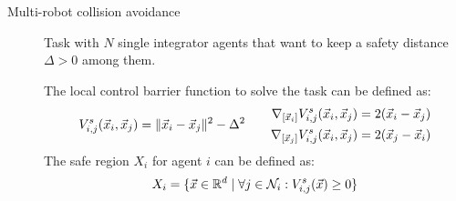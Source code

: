 \begin{description}
    \item[Multi-robot collision avoidance] 
        Task with $N$ single integrator agents that want to keep a safety distance $\Delta > 0$ among them.

        The local control barrier function to solve the task can be defined as:
        \[
            V^s_{i,j}({\vec{x}}_i, {\vec{x}}_j) = \Vert {\vec{x}}_i - {\vec{x}}_j \Vert^2 - \Delta^2
            \qquad
            \begin{aligned}
                \nabla_{[{\vec{x}}_i]} V_{i,j}^s({\vec{x}}_i, {\vec{x}}_j) &= 2({\vec{x}}_i - {\vec{x}}_j) \\
                \nabla_{[{\vec{x}}_j]} V_{i,j}^s({\vec{x}}_i, {\vec{x}}_j) &= 2({\vec{x}}_j - {\vec{x}}_i)
            \end{aligned}
        \]
        The safe region $X_i$ for agent $i$ can be defined as:
        \[
            X_i = \{ {\vec{x}} \in \mathbb{R}^d \mid \forall j \in \mathcal{N}_i: V_{i,j}^s({\vec{x}}) \geq 0 \}
        \]
\end{description}